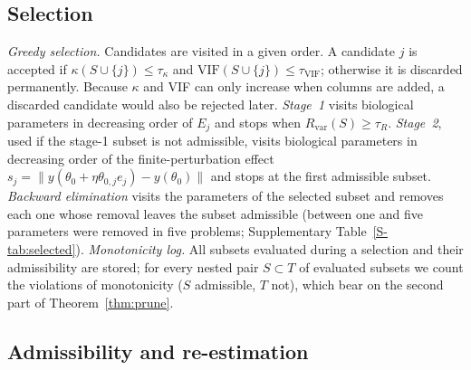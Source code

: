 \documentclass[pdflatex,sn-nature]{sn-jnl}
\theoremstyle{plain}
\begin{document}
\subsection*{Selection}\label{met:selection}

\emph{Greedy selection.} Candidates are visited in a given order. A candidate $j$ is accepted if $\kappa(S\cup\{j\})\le\tau_\kappa$ and $\mathrm{VIF}(S\cup\{j\})\le\tau_{\mathrm{VIF}}$; otherwise it is discarded permanently. Because $\kappa$ and VIF can only increase when columns are added, a discarded candidate would also be rejected later. \emph{Stage~1} visits biological parameters in decreasing order of $E_j$ and stops when $R_{\mathrm{var}}(S)\ge\tau_R$. \emph{Stage~2}, used if the stage-1 subset is not admissible, visits biological parameters in decreasing order of the finite-perturbation effect $s_j=\|y(\theta_0+\eta\theta_{0,j}e_j)-y(\theta_0)\|$ and stops at the first admissible subset. \emph{Backward elimination} visits the parameters of the selected subset and removes each one whose removal leaves the subset admissible (between one and five parameters were removed in five problems; Supplementary Table~\ref{S-tab:selected}). \label{met:monotonicity}\emph{Monotonicity log.} All subsets evaluated during a selection and their admissibility are stored; for every nested pair $S\subset T$ of evaluated subsets we count the violations of monotonicity ($S$ admissible, $T$ not), which bear on the second part of Theorem~\ref{thm:prune}.

\subsection*{Admissibility and re-estimation}\label{met:adm}
\end{document}
